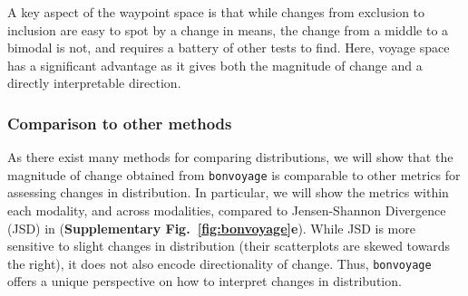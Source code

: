 A key aspect of the waypoint space is that while changes from exclusion to inclusion are easy to spot by a change in means, the change from a middle to a bimodal is not, and requires a battery of other tests to find. Here, voyage space has a significant advantage as it gives both the magnitude of change and a directly interpretable direction. %






\subsubsection{Comparison to other methods}

As there exist many methods for comparing distributions, we will show that the magnitude of change obtained from \texttt{bonvoyage} is comparable to other metrics for assessing changes in distribution. In particular, we will show the metrics within each modality, and across modalities, compared to Jensen-Shannon Divergence\cite{Anonymous:2011vn} (JSD) in (\textbf{Supplementary Fig.~\ref{fig:bonvoyage}e}). While JSD is more sensitive to slight changes in distribution (their scatterplots are skewed towards the right), it does not also encode directionality of change. Thus, \texttt{bonvoyage} offers a unique perspective on how to interpret changes in distribution.



